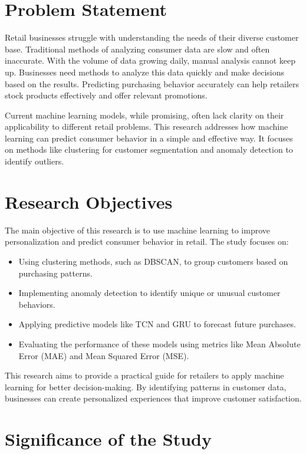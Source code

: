 \documentclass[12pt, a4paper,twoside]{report}
\theoremstyle{plain} %
\theoremstyle{definition} %
\theoremstyle{remark} %
\numberwithin{equation}{chapter}
\begin{document}
\section{Problem Statement}

Retail businesses struggle with understanding the needs of their diverse customer base. Traditional methods of analyzing consumer data are slow and often inaccurate. With the volume of data growing daily, manual analysis cannot keep up. Businesses need methods to analyze this data quickly and make decisions based on the results. Predicting purchasing behavior accurately can help retailers stock products effectively and offer relevant promotions.

Current machine learning models, while promising, often lack clarity on their applicability to different retail problems. This research addresses how machine learning can predict consumer behavior in a simple and effective way. It focuses on methods like clustering for customer segmentation and anomaly detection to identify outliers.

\section{Research Objectives}

The main objective of this research is to use machine learning to improve personalization and predict consumer behavior in retail. The study focuses on:

\begin{itemize}
    \item Using clustering methods, such as DBSCAN, to group customers based on purchasing patterns.
    \item Implementing anomaly detection to identify unique or unusual customer behaviors.
    \item Applying predictive models like TCN and GRU to forecast future purchases.
    \item Evaluating the performance of these models using metrics like Mean Absolute Error (MAE) and Mean Squared Error (MSE).
\end{itemize}

This research aims to provide a practical guide for retailers to apply machine learning for better decision-making. By identifying patterns in customer data, businesses can create personalized experiences that improve customer satisfaction.

\section{Significance of the Study}
\end{document}
